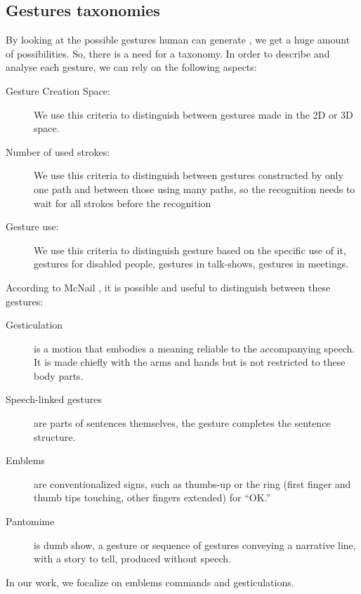 \documentclass{llncs}
\begin{document}
\subsection{Gestures taxonomies}
By looking at the possible gestures human can generate \cite{Gesturecraft}, we
get a huge amount of possibilities. So, there is a need for a taxonomy.
In order to describe and analyse each gesture, we can rely on the following
aspects:
\begin{description}
 \item[Gesture Creation Space:] We use this criteria to distinguish between gestures made in the 2D or 3D space.
 \item[Number of used strokes:] We use this criteria to distinguish between gestures constructed by only one path and between those using many paths, so the recognition needs to wait for all strokes before the recognition
 \item[Gesture use:] We use this criteria to distinguish gesture based on the specific use of it, gestures for disabled people, gestures in talk-shows, gestures in meetings.
\end{description}
According to McNail \cite{gestureThought}, it is possible and useful to
distinguish between these gestures:
\begin{description}
 \item[Gesticulation] is a motion that embodies a meaning reliable to the
accompanying speech. It is made chiefly with the arms and hands but is not
restricted to these body parts.
 \item[Speech-linked gestures] are parts of sentences themselves, the gesture
completes the sentence structure.
 \item[Emblems] are conventionalized signs, such as thumbs-up or the ring (first
finger and thumb tips touching, other fingers extended) for ``OK.''
 \item[Pantomime] is dumb show, a gesture or sequence of gestures conveying a
narrative line, with a story to tell, produced without speech.
\end{description}

In our work, we focalize on emblems commands and gesticulations.
\end{document}
